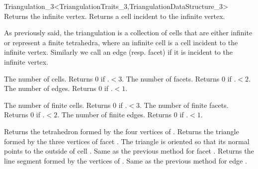 \begin{ccRefClass}{Triangulation_3<TriangulationTraits_3,TriangulationDataStructure_3>}
{Returns the infinite vertex.}
\ccGlue
{}
{Returns a cell incident to the infinite vertex.}


As previously said, the triangulation is a collection of cells that
are either infinite or represent a finite tetrahedra, where an
infinite cell is a 
cell incident to the infinite vertex. Similarly we call
an edge (resp. facet)  if it is incident to the infinite vertex.

{The number of cells. Returns 0 if \ccVar.$<3$.}
\ccGlue
{}
{The number of facets. Returns 0 if \ccVar.$<2$.}
\ccGlue
{}
{The number of edges. Returns 0 if \ccVar.$<1$.}

{The number of finite cells. Returns 0 if \ccVar.$<3$.}
\ccGlue
{}
{The number of finite facets. Returns 0 if \ccVar.$<2$.}
\ccGlue
{}
{The number of finite edges. Returns 0 if \ccVar.$<1$.}


{Returns the tetrahedron formed by the four vertices of .
}
\ccGlue
{}
{Returns the triangle formed by the three vertices of facet
. The triangle is oriented so that its normal points to the
outside of cell . 
}
\ccGlue
{}
{Same as the previous method for facet . 
}
\ccGlue
{}
{Returns the line segment formed by the vertices of .
}
\ccGlue
{}
{Same as the previous method for edge .
}


\end{ccRefClass}
